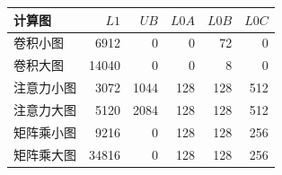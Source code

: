 \begin{tabular}{lrrrrr}\toprule
计算图 & $L1$ & $UB$ & $L0A$ & $L0B$ & $L0C$\\\midrule
卷积小图 & 6912 & 0 & 0 & 72 & 0\\
卷积大图 & 14040 & 0 & 0 & 8 & 0\\
注意力小图 & 3072 & 1044 & 128 & 128 & 512\\
注意力大图 & 5120 & 2084 & 128 & 128 & 512\\
矩阵乘小图 & 9216 & 0 & 128 & 128 & 256\\
矩阵乘大图 & 34816 & 0 & 128 & 128 & 256\\
\bottomrule\end{tabular}
